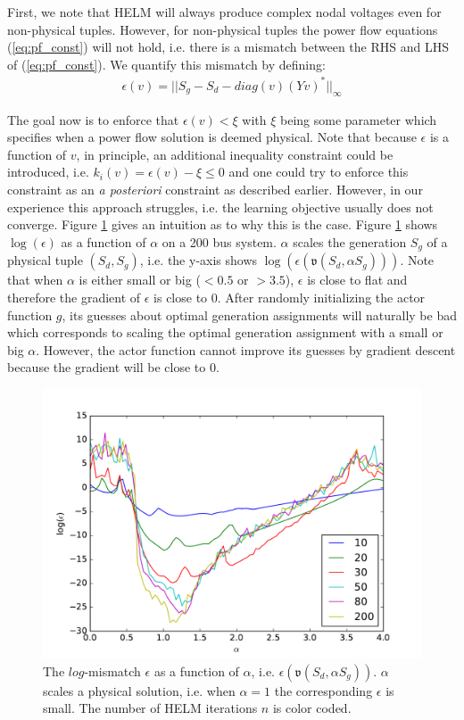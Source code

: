 First, we note that HELM will always produce complex nodal voltages even for non-physical tuples. However, for non-physical tuples the power flow equations (\ref{eq:pf_const}) will not hold, i.e. there is a mismatch between the RHS and LHS of (\ref{eq:pf_const}). We quantify this mismatch by defining: 
\begin{align*}
\epsilon(v) = ||S_{g} - S_{d} - diag(v)(Yv)^*||_\infty
\end{align*} 

The goal now is to enforce that $\epsilon(v) < \xi$ with $\xi$ being some parameter which specifies when a power flow solution is deemed physical. Note that because $\epsilon$ is a function of $v$, in principle, an additional inequality constraint could be introduced, i.e. $k_i(v) = \epsilon(v) - \xi \leq 0$ and one could try to enforce this constraint as an \emph{a posteriori} constraint as described earlier. However, in our experience this approach struggles, i.e. the learning objective usually does not converge. Figure \ref{fig:errors} gives an intuition as to why this is the case. Figure \ref{fig:errors} shows $\log(\epsilon)$ as a function of $\alpha$ on a 200 bus system. $\alpha$ scales the generation $S_g$ of a physical tuple $(S_d,S_g)$, i.e. the y-axis shows $\log(\epsilon(\mathfrak{v}(S_d,\alpha S_g)))$. Note that when $\alpha$ is either small or big ($<0.5$ or $>3.5$), $\epsilon$ is close to flat and therefore the gradient of $\epsilon$ is close to 0. After randomly initializing the actor function $g$, its guesses about optimal generation assignments will naturally be bad which corresponds to scaling the optimal generation assignment with a small or big $\alpha$. However, the actor function cannot improve its guesses by gradient descent because the gradient will be close to 0.

\begin{figure}
\includegraphics[width=\linewidth]{krtofl/error_phys.pdf}
\caption[LOPF: The $log$-mismatch $\epsilon$ as a function of $\alpha$]{The $log$-mismatch $\epsilon$ as a function of $\alpha$, i.e. $\epsilon(\mathfrak{v}(S_d,\alpha S_g))$. $\alpha$ scales a physical solution, i.e. when $\alpha = 1$ the corresponding $\epsilon$ is small. The number of HELM iterations $n$ is color coded.}
\label{fig:errors}
\end{figure}

